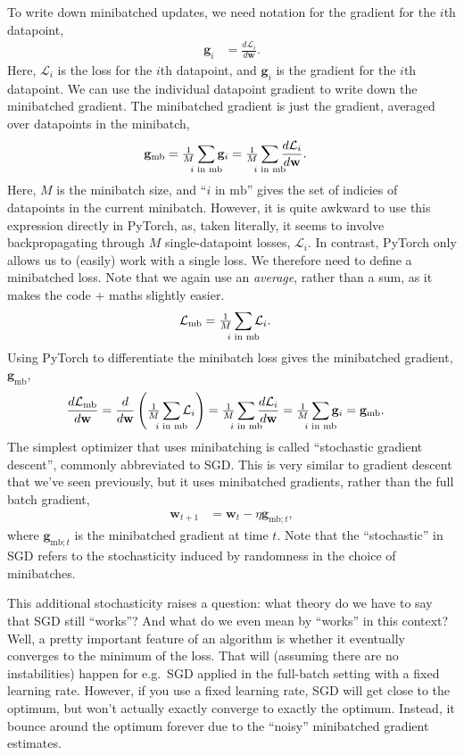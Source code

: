 \documentclass{article}
\newcommand{\dt}[2][]{\frac{d #1}{d #2}}
\newcommand{\dLi}{\dt[{\Li}]}
\newcommand{\dLmb}{\dt[{\Lmb}]}
\newcommand{\bracket}[3]{\left#1 #3 \right#2}
\renewcommand{\b}{\bracket{(}{)}}
\newcommand{\0}{\mathbf{0}}
\newcommand{\g}{\mathbf{g}}
\newcommand{\gmb}{\g_\text{mb}}
\newcommand{\gmbt}{\g_{\text{mb}; t}}
\newcommand{\w}{\mathbf{w}}
\renewcommand{\L}{\mathcal{L}}
\newcommand{\Li}{\L_i}
\newcommand{\Lmb}{\L_\text{mb}}
\newcommand{\iinmb}{{i \text{ in mb}}}
\newcommand{\mbsize}{M}
\newcommand{\mbavg}{\tfrac{1}{\mbsize} \sum_{\mathclap{\iinmb}}}
\begin{document}
To write down minibatched updates, we need notation for the gradient for the $i$th datapoint,
\begin{align}
  \g_i &= \dLi{\w}.
\end{align}
Here, $\Li$ is the loss for the $i$th datapoint, and $\g_i$ is the gradient for the $i$th datapoint.
We can use the individual datapoint gradient to write down the minibatched gradient. 
The minibatched gradient is just the gradient, averaged over datapoints in the minibatch,
\begin{align}
  \label{eq:gmb}
  \gmb &= \mbavg \g_i =  \mbavg \dLi{\w}.
\end{align}
Here, $\mbsize$ is the minibatch size, and ``$\iinmb$'' gives the set of indicies of datapoints in the current minibatch.
However, it is quite awkward to use this expression directly in PyTorch, as, taken literally, it seems to involve backpropagating through $M$ single-datapoint losses, $\Li$.
In contrast, PyTorch only allows us to (easily) work with a single loss.
We therefore need to define a minibatched loss.
Note that we again use an \textit{average}, rather than a sum, as it makes the code + maths slightly easier.
\begin{align}
  \Lmb &= \mbavg \L_i.
\end{align}
Using PyTorch to differentiate the minibatch loss gives the minibatched gradient, $\gmb$,
\begin{align}
  \dLmb{\w} &= \dt{\w} \b{\mbavg \L_i} = \mbavg \dLi{\w} = \mbavg \g_i = \gmb.
\end{align}
The simplest optimizer that uses minibatching is called ``stochastic gradient descent'', commonly abbreviated to SGD.
This is very similar to gradient descent that we've seen previously, but it uses minibatched gradients, rather than the full batch gradient,
\begin{align}
  \w_{t+1} &= \w_t - \eta \gmbt,
\end{align}
where $\gmbt$ is the minibatched gradient at time $t$.
Note that the ``stochastic'' in SGD refers to the stochasticity induced by randomness in the choice of minibatches.

This additional stochasticity raises a question: what theory do we have to say that SGD still ``works''?
And what do we even mean by ``works'' in this context?
Well, a pretty important feature of an algorithm is whether it eventually converges to the minimum of the loss.
That will (assuming there are no instabilities) happen for e.g.\ SGD applied in the full-batch setting with a fixed learning rate.
However, if you use a fixed learning rate, SGD will get close to the optimum, but won't actually exactly converge to exactly the optimum. 
Instead, it bounce around the optimum forever due to the ``noisy'' minibatched gradient estimates.
\end{document}
